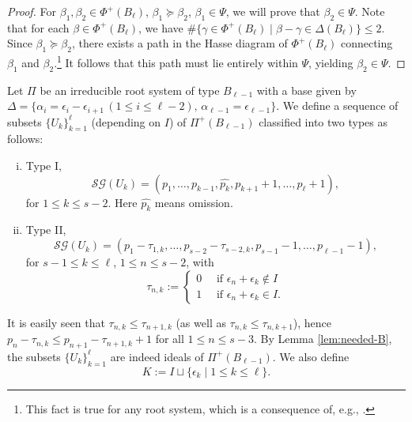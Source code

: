\documentclass[12pt]{amsart}
\theoremstyle{plain}
\theoremstyle{definition}
\theoremstyle{remark}
\newcommand{\SG}{{\mathcal{SG}}}
\begin{document}
\begin{proof} 
For $\beta_1,\beta_2 \in \Phi^+(B_\ell)$, $\beta_1 \succeq \beta_2$, $\beta_ 1 \in \Psi$, we will prove that $\beta_2 \in \Psi$. 
Note that for each $\beta\in \Phi^+(B_\ell)$, we have $\# \{ \gamma \in \Phi^+(B_\ell) \mid \beta - \gamma \in \Delta(B_\ell)\} \le 2$.
Since $\beta_1 \succeq \beta_2$, there exists a path in the Hasse diagram of $\Phi^+(B_\ell)$ connecting $\beta_1$ and $\beta_2$.\footnote{This fact is true for any root system, which is a consequence of, e.g., \cite[Lemma 3.2]{S05}.} 
It follows that this path must lie entirely within $\Psi$, yielding $\beta_2 \in \Psi$.
 \end{proof} 


Let $\Pi$ be an irreducible root system of type $B_{\ell-1}$ with a base given by $\Delta=\{\alpha_i = \epsilon_i - \epsilon_{i+1}\,(1 \le i  \le \ell-2),\, \alpha_{\ell-1} =\epsilon_{\ell-1} \}$.
We define a sequence of subsets $\{U_k\}_{k=1}^\ell$ (depending on $I$) of $\Pi^+(B_{\ell-1})$ classified into two types as follows:
\begin{enumerate}[(i)]
\item Type I, 
   \begin{equation}\label{eq:1st-Uk}
   \SG(U_k)=(p_1,\ldots,p_{k-1}, \widehat{p_{k}}, p_{k+1}+1,\ldots,p_{\ell}+1), 
\end{equation}
for $1 \le k \le s-2$. Here $\widehat{p_{k}}$ means omission.

\item
Type II,
  \begin{equation}\label{eq:2nd-Uk}
  \SG(U_k)=(p_1-\tau_{1,k},\ldots,p_{s-2}-\tau_{s-2,k}, p_{s-1}-1,\ldots,p_{\ell-1}-1), 
\end{equation}
 for $s-1\le k \le \ell$,  $1 \le n \le s-2$, with
\begin{equation*}
\tau_{n,k}:=
\begin{cases}
0 \quad\mbox{ if $\epsilon_n+\epsilon_k  \notin I$} \\ 
1 \quad\mbox{ if $\epsilon_n+\epsilon_k   \in I$.}
\end{cases}
\end{equation*}
\end{enumerate}
It is easily seen that $\tau_{n,k} \le \tau_{n+1,k}$ (as well as $\tau_{n,k} \le \tau_{n,k+1}$), hence $p_{n}-\tau_{n,k} \le p_{n+1}-\tau_{n+1,k}+1$ for all $1 \le n \le s-3$.
By Lemma \ref{lem:needed-B}, the subsets $\{U_k\}_{k=1}^\ell$ are indeed ideals of $\Pi^+(B_{\ell-1})$. We also define
  \begin{equation}\label{eq:D-2nd-summand}
K:=I \sqcup \{\epsilon_k \mid 1 \le k \le \ell\}.
\end{equation}
\end{document}
